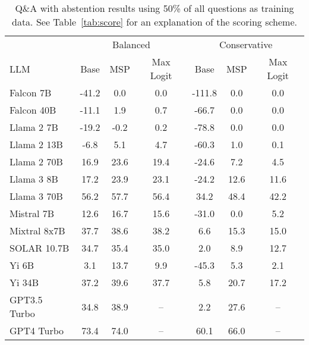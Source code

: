 \begin{table}[h]
\centering
\caption{Q\&A with abstention results using 50\% of all questions as training data. See Table~\ref{tab:score} for an explanation of the scoring scheme.}
\label{tab:score_k=half}
\begin{tabular}{lcccccc}
\toprule
& \multicolumn{3}{c}{Balanced} & \multicolumn{3}{c}{Conservative} \\ 
LLM & Base & MSP & Max Logit & Base & MSP & Max Logit \\ 
\cmidrule(lr){1-1}\cmidrule(lr){2-4}\cmidrule(lr){5-7} 
Falcon 7B & -41.2 & 0.0 & 0.0 & -111.8 & 0.0 & 0.0\\
Falcon 40B & -11.1 & 1.9 & 0.7 & -66.7 & 0.0 & 0.0\\
Llama 2 7B & -19.2 & -0.2 & 0.2 & -78.8 & 0.0 & 0.0\\
Llama 2 13B & -6.8 & 5.1 & 4.7 & -60.3 & 1.0 & 0.1\\
Llama 2 70B & 16.9 & 23.6 & 19.4 & -24.6 & 7.2 & 4.5\\
Llama 3 8B & 17.2 & 23.9 & 23.1 & -24.2 & 12.6 & 11.6\\
Llama 3 70B & 56.2 & 57.7 & 56.4 & 34.2 & 48.4 & 42.2\\
Mistral 7B & 12.6 & 16.7 & 15.6 & -31.0 & 0.0 & 5.2\\
Mixtral 8x7B & 37.7 & 38.6 & 38.2 & 6.6 & 15.3 & 15.0\\
SOLAR 10.7B & 34.7 & 35.4 & 35.0 & 2.0 & 8.9 & 12.7\\
Yi 6B & 3.1 & 13.7 & 9.9 & -45.3 & 5.3 & 2.1\\
Yi 34B & 37.2 & 39.6 & 37.7 & 5.8 & 20.7 & 17.2\\
GPT3.5 Turbo & 34.8 & 38.9 & -- & 2.2 & 27.6 & --\\
GPT4 Turbo & 73.4 & 74.0 & -- & 60.1 & 66.0 & --\\
\bottomrule
\end{tabular}
\end{table}
